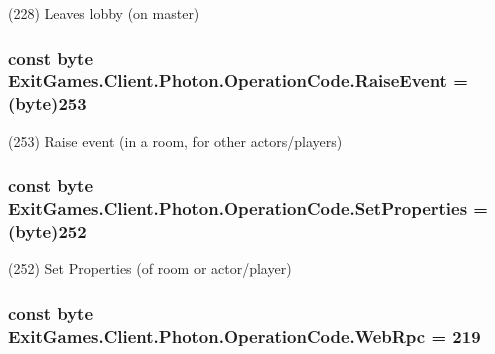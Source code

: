 (228) Leaves lobby (on master)

\subsubsection[{\texorpdfstring{Raise\+Event}{RaiseEvent}}]{\setlength{\rightskip}{0pt plus 5cm}const byte Exit\+Games.\+Client.\+Photon.\+Operation\+Code.\+Raise\+Event = (byte)253}\hypertarget{class_exit_games_1_1_client_1_1_photon_1_1_operation_code_a629f95f520a21f28345366d84d9171bf}{}\label{class_exit_games_1_1_client_1_1_photon_1_1_operation_code_a629f95f520a21f28345366d84d9171bf}


(253) Raise event (in a room, for other actors/players)

\subsubsection[{\texorpdfstring{Set\+Properties}{SetProperties}}]{\setlength{\rightskip}{0pt plus 5cm}const byte Exit\+Games.\+Client.\+Photon.\+Operation\+Code.\+Set\+Properties = (byte)252}\hypertarget{class_exit_games_1_1_client_1_1_photon_1_1_operation_code_a1e9bdcbf6be26d2157af2df0daaef988}{}\label{class_exit_games_1_1_client_1_1_photon_1_1_operation_code_a1e9bdcbf6be26d2157af2df0daaef988}


(252) Set Properties (of room or actor/player)

\subsubsection[{\texorpdfstring{Web\+Rpc}{WebRpc}}]{\setlength{\rightskip}{0pt plus 5cm}const byte Exit\+Games.\+Client.\+Photon.\+Operation\+Code.\+Web\+Rpc = 219}\hypertarget{class_exit_games_1_1_client_1_1_photon_1_1_operation_code_af3a967de533671c1a5b04c698c19c84b}{}\label{class_exit_games_1_1_client_1_1_photon_1_1_operation_code_af3a967de533671c1a5b04c698c19c84b}


